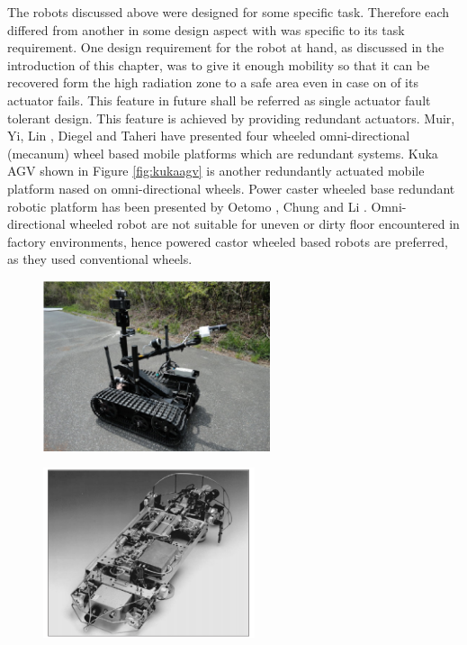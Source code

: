 The robots discussed above were designed for some specific task. Therefore each differed from another in some design aspect with was specific to its task requirement. One  design requirement for the robot at hand, as discussed in the introduction of this chapter, was to give it enough mobility so that it can be recovered form the high radiation zone to a safe area even in case on of its actuator fails. This feature in future shall be referred as single actuator fault tolerant design. This feature is achieved by providing redundant actuators. Muir\cite{muir1987kinematic}, Yi\cite{yi2002kinematics}, Lin \cite{lin2013modeling}, Diegel \cite{diegel2002improved} and Taheri \cite{taheri2015kinematic} have presented four wheeled omni-directional (mecanum) wheel based mobile platforms which are redundant systems. Kuka AGV shown in Figure \ref{fig:kukaagv} is another redundantly actuated mobile platform nased on omni-directional wheels.  Power caster wheeled base redundant robotic platform has been presented by Oetomo \cite{oetomo2008singularity}, Chung \cite{chung2010design} and Li \cite{li2006wheel}. Omni-directional wheeled robot are not suitable for uneven or dirty floor encountered in factory environments, hence powered castor wheeled based robots are preferred, as they used conventional wheels.    
\begin{figure}
	\centering
	\begin{minipage}{.5\textwidth}
		\centering
		\includegraphics[height=5cm,keepaspectratio]{Chapter2/fig/FukusimaRobot}
		\label{fig:fukuRobot}
	\end{minipage}%
	\begin{minipage}{.5\textwidth}
		\centering
		\includegraphics[width=1\linewidth,height=5cm,keepaspectratio]{Chapter2/fig/nero3}
		\label{fig:nero3}
	\end{minipage}
\end{figure}


